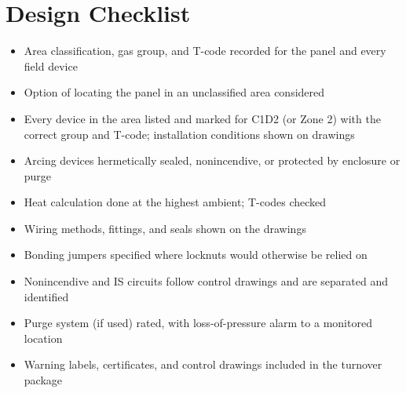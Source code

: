 \section{Design Checklist}
\begin{itemize}[itemsep=1pt, label=$\square$]
  \item Area classification, gas group, and T-code recorded for the panel and every field device
  \item Option of locating the panel in an unclassified area considered
  \item Every device in the area listed and marked for C1D2 (or Zone 2) with the correct group and T-code; installation conditions shown on drawings
  \item Arcing devices hermetically sealed, nonincendive, or protected by enclosure or purge
  \item Heat calculation done at the highest ambient; T-codes checked
  \item Wiring methods, fittings, and seals shown on the drawings
  \item Bonding jumpers specified where locknuts would otherwise be relied on
  \item Nonincendive and IS circuits follow control drawings and are separated and identified
  \item Purge system (if used) rated, with loss-of-pressure alarm to a monitored location
  \item Warning labels, certificates, and control drawings included in the turnover package
\end{itemize}
